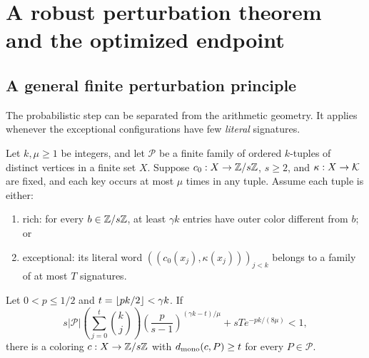 \section{A robust perturbation theorem and the optimized endpoint}
\label{sec:perturbation}

\subsection{A general finite perturbation principle}

The probabilistic step can be separated from the arithmetic geometry.
It applies whenever the exceptional configurations have few
\emph{literal} signatures.

\begin{theorem}
\label{thm:abstract}
Let \(k,\mu\ge1\) be integers, and let \(\mathcal P\) be a finite
family of ordered \(k\)-tuples of
distinct vertices in a finite set \(X\). Suppose
\(c_0:X\to\mathbb Z/s\mathbb Z\), \(s\ge2\), and \(\kappa:X\to\mathcal K\) are fixed,
and each key occurs at most \(\mu\) times in any tuple.
Assume each tuple is either:
\begin{enumerate}
 \item rich: for every \(b\in\mathbb Z/s\mathbb Z\), at least \(\gamma k\)
       entries have outer color different from \(b\); or
 \item exceptional: its literal word
       \(((c_0(x_j),\kappa(x_j)))_{j<k}\) belongs to a family
       of at most \(T\) signatures.
\end{enumerate}
Let \(0<p\le1/2\) and \(t=\left\lfloor pk/2\right\rfloor<\gamma k\). If
\begin{equation}\label{eq:abstract-criterion}
 s|\mathcal P|
 \left(\sum_{j=0}^t\binom kj\right)
 \left(\frac p{s-1}\right)^{(\gamma k-t)/\mu}
 +sT e^{-pk/(8\mu)}<1,
\end{equation}
there is a coloring \(c:X\to\mathbb Z/s\mathbb Z\) with
\(d_{\rm mono}(c,P)\ge t\) for every \(P\in\mathcal P\).
\end{theorem}


